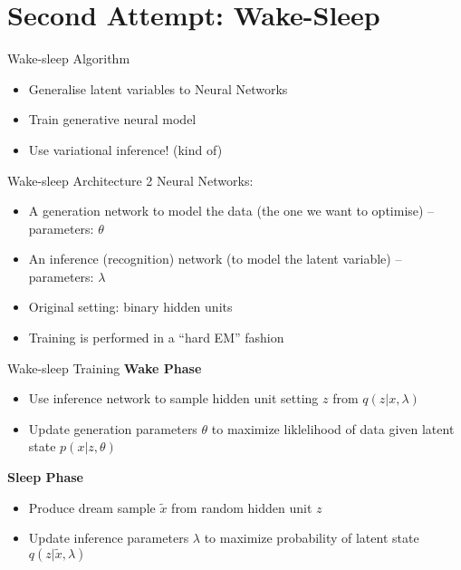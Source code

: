 \documentclass[14pt]{beamer}
\begin{document}
\section{Second Attempt: Wake-Sleep}
\frame{\tableofcontents[currentsection]}

\begin{frame}{Wake-sleep Algorithm}
\begin{itemize}
\item Generalise latent variables to Neural Networks
\item Train generative neural model
\item Use variational inference! (kind of)
\end{itemize}
\end{frame}

\begin{frame}{Wake-sleep Architecture}
2 Neural Networks:
\begin{itemize}
\pause
\item A generation network to model the data (the one we want to optimise) -- parameters: $ \theta $
\pause
\item An inference (recognition) network (to model the latent variable) -- parameters: $ \lambda $
\pause
\item Original setting: binary hidden units
\pause
\item Training is performed in a ``hard EM'' fashion
\end{itemize}
\end{frame}

\begin{frame}{Wake-sleep Training}
\textbf{Wake Phase} \\
\begin{itemize}
\item Use inference network to sample hidden unit setting $ z $ from $ q(z|x,\lambda) $
\item Update generation parameters $ \theta $ to maximize liklelihood of data given latent state $ p(x|z,\theta) $
\end{itemize}
\pause
\textbf{Sleep Phase}
\begin{itemize}
\item Produce dream sample $ \tilde{x} $ from random hidden unit $ z $
\item Update inference parameters $ \lambda $ to maximize probability of latent state $ q(z|\tilde{x},\lambda) $
\end{itemize}
\end{frame}
\end{document}
